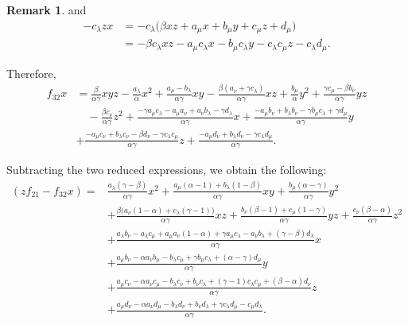\documentclass{amsart}
\theoremstyle{definition}
\newtheorem{remark}[theorem]{Remark}
\theoremstyle{remark}
\numberwithin{equation}{section}
\begin{document}
\begin{remark}
and
\begin{align*}
-c_{\lambda}zx
&=-c_{\lambda}\bigl(\beta xz+a_{\mu}x+b_{\mu}y+c_{\mu}z+d_{\mu}\bigr)\\
&=-\beta c_{\lambda}xz-a_{\mu}c_{\lambda}x-b_{\mu}c_{\lambda}y-c_{\lambda}c_{\mu}z-c_{\lambda}d_{\mu}.
\end{align*}

Therefore,
\begin{align*}
f_{32}x
& = \frac{\beta}{\alpha\gamma}xyz
-\frac{a_{\lambda}}{\alpha}x^2
+\frac{a_{\mu}-b_{\lambda}}{\alpha\gamma}xy
-\frac{\beta(a_{\nu}+\gamma c_{\lambda})}{\alpha\gamma}xz
+\frac{b_{\mu}}{\alpha}y^2 + \frac{\gamma c_{\mu}-\beta b_{\nu}}{\alpha\gamma}yz \\
& \quad - \frac{\beta c_{\nu}}{\alpha\gamma}z^2 + \frac{-\gamma a_{\mu}c_{\lambda}-a_{\mu}a_{\nu}+a_{\nu}b_{\lambda}-\gamma d_{\lambda}}{\alpha\gamma}x + \frac{-a_{\mu}b_{\nu}+b_{\lambda}b_{\nu}-\gamma b_{\mu}c_{\lambda}+\gamma d_{\mu}}{\alpha\gamma}y\\
& 
+\frac{-a_{\mu}c_{\nu}+b_{\lambda}c_{\nu}-\beta d_{\nu}-\gamma c_{\lambda}c_{\mu}}{\alpha\gamma}z + \frac{-a_{\mu}d_{\nu}+b_{\lambda}d_{\nu}-\gamma c_{\lambda}d_{\mu}}{\alpha\gamma}.
\end{align*}

Subtracting the two reduced expressions, we obtain the following:
{\small{
\begin{align*}
(zf_{21}-f_{32}x)
=&\frac{a_{\lambda}(\gamma-\beta)}{\alpha\gamma}x^2
+\frac{a_{\mu}(\alpha-1)+b_{\lambda}(1-\beta)}{\alpha\gamma}xy
+\frac{b_{\mu}(\alpha-\gamma)}{\alpha\gamma}y^2\\
&+\frac{\beta\bigl(a_{\nu}(1-\alpha)+c_{\lambda}(\gamma-1)\bigr)}{\alpha\gamma}xz
+\frac{b_{\nu}(\beta-1)+c_{\mu}(1-\gamma)}{\alpha\gamma}yz
+\frac{c_{\nu}(\beta-\alpha)}{\alpha\gamma}z^2\\
&+\frac{a_{\lambda}b_{\nu}-a_{\lambda}c_{\mu}+a_{\mu}a_{\nu}(1-\alpha)+\gamma a_{\mu}c_{\lambda}-a_{\nu}b_{\lambda}+(\gamma-\beta)d_{\lambda}}{\alpha\gamma}x\\
&+\frac{a_{\mu}b_{\nu}-\alpha a_{\nu}b_{\mu}-b_{\lambda}c_{\mu}+\gamma b_{\mu}c_{\lambda}+(\alpha-\gamma)d_{\mu}}{\alpha\gamma}y\\
&+\frac{a_{\mu}c_{\nu}-\alpha a_{\nu}c_{\mu}-b_{\lambda}c_{\nu}+b_{\nu}c_{\lambda}+(\gamma-1)c_{\lambda}c_{\mu}+(\beta-\alpha)d_{\nu}}{\alpha\gamma}z\\
&+\frac{a_{\mu}d_{\nu}-\alpha a_{\nu}d_{\mu}-b_{\lambda}d_{\nu}+b_{\nu}d_{\lambda}+\gamma c_{\lambda}d_{\mu}-c_{\mu}d_{\lambda}}{\alpha\gamma}.
\end{align*}
}}


\end{remark}
\end{document}
